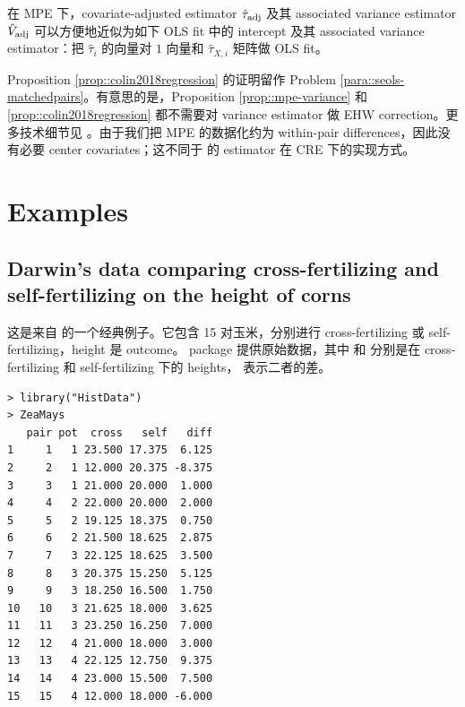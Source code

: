 \begin{proposition}\label{prop::colin2018regression}
在 MPE 下，covariate-adjusted estimator $\hat{\tau}_{\textup{adj}} $ 及其 associated variance estimator $\hat{V} _{\textup{adj}}$ 可以方便地近似为如下 OLS fit 中的 intercept 及其 associated variance estimator：把 $\hat{\tau}_i $ 的向量对 $1$ 向量和 $\hat{\tau}_{X,i} $ 矩阵做 OLS fit。
\end{proposition}


Proposition \ref{prop::colin2018regression} 的证明留作 Problem \ref{para::seols-matchedpairs}。有意思的是，Proposition \ref{prop::mpe-variance} 和 \ref{prop::colin2018regression} 都不需要对 variance estimator 做 EHW correction。更多技术细节见 \citet{fogarty2018regression}。由于我们把 MPE 的数据化约为 within-pair differences，因此没有必要 center covariates；这不同于 \citet{lin2013} 的 estimator 在 CRE 下的实现方式。

 


\section{Examples}

\subsection{Darwin's data comparing cross-fertilizing and self-fertilizing on the height of corns}
\label{sec::frt-darwin-mpe}

这是来自 \citet{Fisher:1935} 的一个经典例子。它包含 15 对玉米，分别进行 cross-fertilizing 或 self-fertilizing，height 是 outcome。 package  提供原始数据，其中  和  分别是在 cross-fertilizing 和 self-fertilizing 下的 heights， 表示二者的差。

\begin{lstlisting}
> library("HistData")
> ZeaMays
   pair pot  cross   self   diff
1     1   1 23.500 17.375  6.125
2     2   1 12.000 20.375 -8.375
3     3   1 21.000 20.000  1.000
4     4   2 22.000 20.000  2.000
5     5   2 19.125 18.375  0.750
6     6   2 21.500 18.625  2.875
7     7   3 22.125 18.625  3.500
8     8   3 20.375 15.250  5.125
9     9   3 18.250 16.500  1.750
10   10   3 21.625 18.000  3.625
11   11   3 23.250 16.250  7.000
12   12   4 21.000 18.000  3.000
13   13   4 22.125 12.750  9.375
14   14   4 23.000 15.500  7.500
15   15   4 12.000 18.000 -6.000
\end{lstlisting}
 


